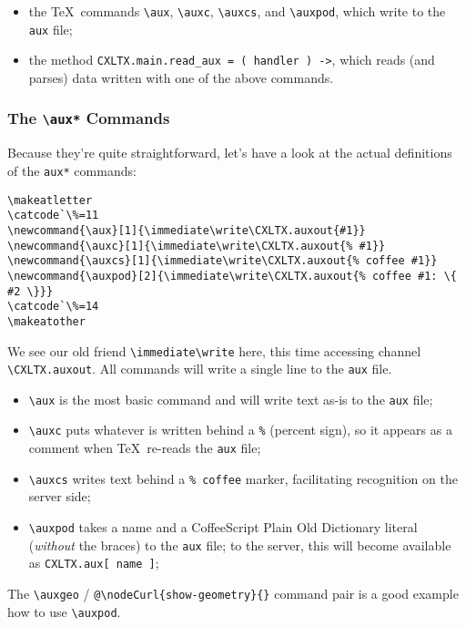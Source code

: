 \begin{itemize}
\item
  the \TeX\ commands \verb#\aux#, \verb#\auxc#, \verb#\auxcs#, and \verb#\auxpod#, which write to the
  \verb#aux# file;
\item
  the method \verb#CXLTX.main.read_aux = ( handler ) ->#, which reads (and parses) data written with one of
  the above commands.
\end{itemize}

\subsubsection{The \texttt{\textbackslash{}aux*} Commands}\label{auxcommands}

Because they're quite straightforward, let's have a look at the actual definitions of the
\verb#aux*# commands:

\begin{verbatim}
\makeatletter
\catcode`\%=11
\newcommand{\aux}[1]{\immediate\write\CXLTX.auxout{#1}}
\newcommand{\auxc}[1]{\immediate\write\CXLTX.auxout{% #1}}
\newcommand{\auxcs}[1]{\immediate\write\CXLTX.auxout{% coffee #1}}
\newcommand{\auxpod}[2]{\immediate\write\CXLTX.auxout{% coffee #1: \{ #2 \}}}
\catcode`\%=14
\makeatother
\end{verbatim}

We see our old friend \verb#\immediate\write# here, this time accessing channel \verb#\CXLTX.auxout#. All commands
will write a single line to the \verb#aux# file.

\begin{itemize}
\item
  \verb#\aux# is the most basic command and will write text as-is to the \verb#aux# file;
\item
  \verb#\auxc# puts whatever is written behind a \verb#%# (percent sign), so it appears as a comment when
  \TeX\ re-reads the \verb#aux# file;
\item
  \verb#\auxcs# writes text behind a \verb#% coffee# marker, facilitating recognition on the server side;
\item
  \verb#\auxpod# takes a name and a CoffeeScript Plain Old Dictionary literal ({\em without} the braces)
  to the \verb#aux# file; to the server, this will become available as \verb#CXLTX.aux[ name ]#;
\end{itemize}

The \verb#\auxgeo# / \verb#@\nodeCurl{show-geometry}{}# command pair is a good example how to use \verb#\auxpod#.


